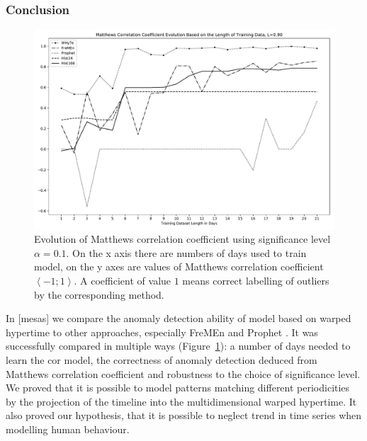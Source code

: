 \subsubsection{Conclusion}
\begin{figure}[t!]
\begin{center}
    \includegraphics[width=1.0\columnwidth]{fig/mathew_graph_90}
    \caption{Evolution of Matthews correlation coefficient using significance level $\alpha=0.1$. On the x axis there are numbers of days used to train model, on the y axes are values of Matthews correlation coefficient $\left<-1;1\right>$. A coefficient of value $1$ means correct labelling of outliers by the corresponding method.   \label{graph:mathew90}}

\end{center}
\end{figure}

In [mesas] we compare the anomaly detection ability of model based on warped hypertime to other approaches, especially FreMEn \cite{krajnik2017fremen} and Prophet \cite{taylor2018forecasting}. 
It was successfully compared in multiple ways (Figure~\ref{graph:mathew90}): a number of days needed to learn the cor model, the correctness of anomaly detection deduced from Matthews correlation coefficient \cite{matthews1975comparison} and robustness to the choice of significance level.
We proved that it is possible to model patterns matching different periodicities by the projection of the timeline into the multidimensional warped hypertime.
It also proved our hypothesis, that it is possible to neglect trend in time series when modelling human behaviour.





